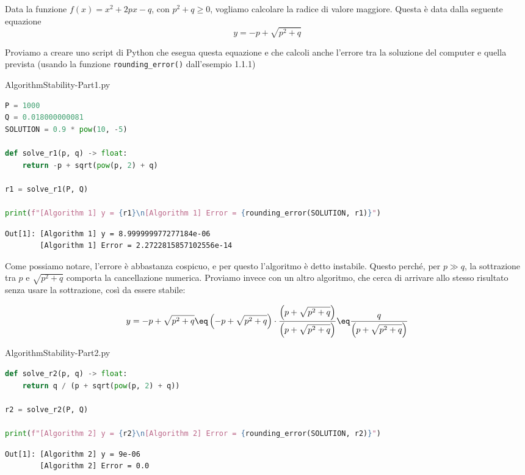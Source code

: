\begin{example}
    Data la funzione $f(x) = x^2 + 2px - q$, con $p^2 + q \geq 0$, vogliamo calcolare la radice di valore maggiore. Questa è data dalla seguente equazione
    \[ y = -p + \sqrt{p^2 + q} \]

    Proviamo a creare uno script di Python che esegua questa equazione e che calcoli anche l'errore tra la soluzione del computer e quella prevista (usando la funzione \verb|rounding_error()| dall'esempio 1.1.1)

    \begin{codeblock}{AlgorithmStability-Part1.py}
        \begin{lstlisting}[language = Python]
P = 1000
Q = 0.018000000081
SOLUTION = 0.9 * pow(10, -5)

def solve_r1(p, q) -> float:
    return -p + sqrt(pow(p, 2) + q)

r1 = solve_r1(P, Q)

print(f"[Algorithm 1] y = {r1}\n[Algorithm 1] Error = {rounding_error(SOLUTION, r1)}")\end{lstlisting}
        \nl
        \begin{tcolorbox}[colback = black!95!Periwinkle!90]
            \begin{lstlisting}[style = notexterm]
Out[1]: [Algorithm 1] y = 8.999999977277184e-06
        [Algorithm 1] Error = 2.2722815857102556e-14\end{lstlisting}
        \end{tcolorbox}
    \end{codeblock}

    Come possiamo notare, l'errore è abbastanza cospicuo, e per questo l'algoritmo è detto instabile. Questo perché, per $p \gg q$, la sottrazione tra $p$ e $\sqrt{p^2 + q}$ comporta la cancellazione numerica. Proviamo invece con un altro algoritmo, che cerca di arrivare allo stesso risultato senza usare la sottrazione, così da essere stabile:

    \[ y = -p + \sqrt{p^2 + q} \eq \left(-p + \sqrt{p^2 + q}\right) \cdot \frac{\left(p + \sqrt{p^2 + q}\right)}{\left(p + \sqrt{p^2 + q}\right)} \eq \frac{q}{\left(p + \sqrt{p^2 + q}\right)} \]

    \begin{codeblock}{AlgorithmStability-Part2.py}
        \begin{lstlisting}[language = Python]
def solve_r2(p, q) -> float:
    return q / (p + sqrt(pow(p, 2) + q))

r2 = solve_r2(P, Q)

print(f"[Algorithm 2] y = {r2}\n[Algorithm 2] Error = {rounding_error(SOLUTION, r2)}")\end{lstlisting}
        \nl
        \begin{tcolorbox}[colback = black!95!Periwinkle!90]
            \begin{lstlisting}[style = notexterm]
Out[1]: [Algorithm 2] y = 9e-06
        [Algorithm 2] Error = 0.0\end{lstlisting}
        \end{tcolorbox}
    \end{codeblock}
\end{example}

